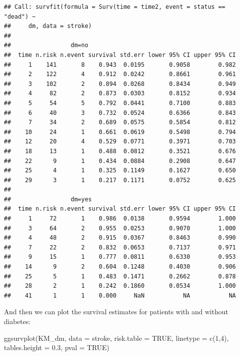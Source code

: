 \documentclass[
  10pt,
]{krantz}
\newenvironment{Shaded}{\begin{snugshade}}{\end{snugshade}}
\newcommand{\AttributeTok}[1]{\textcolor[rgb]{0.77,0.63,0.00}{#1}}
\newcommand{\ConstantTok}[1]{\textcolor[rgb]{0.00,0.00,0.00}{#1}}
\newcommand{\DecValTok}[1]{\textcolor[rgb]{0.00,0.00,0.81}{#1}}
\newcommand{\FloatTok}[1]{\textcolor[rgb]{0.00,0.00,0.81}{#1}}
\newcommand{\FunctionTok}[1]{\textcolor[rgb]{0.00,0.00,0.00}{#1}}
\newcommand{\NormalTok}[1]{#1}
\begin{document}
\begin{verbatim}
## Call: survfit(formula = Surv(time = time2, event = status == "dead") ~ 
##     dm, data = stroke)
## 
##                 dm=no 
##  time n.risk n.event survival std.err lower 95% CI upper 95% CI
##     1    141       8    0.943  0.0195       0.9058        0.982
##     2    122       4    0.912  0.0242       0.8661        0.961
##     3    102       2    0.894  0.0268       0.8434        0.949
##     4     82       2    0.873  0.0303       0.8152        0.934
##     5     54       5    0.792  0.0441       0.7100        0.883
##     6     40       3    0.732  0.0524       0.6366        0.843
##     7     34       2    0.689  0.0575       0.5854        0.812
##    10     24       1    0.661  0.0619       0.5498        0.794
##    12     20       4    0.529  0.0771       0.3971        0.703
##    18     13       1    0.488  0.0812       0.3521        0.676
##    22      9       1    0.434  0.0884       0.2908        0.647
##    25      4       1    0.325  0.1149       0.1627        0.650
##    29      3       1    0.217  0.1171       0.0752        0.625
## 
##                 dm=yes 
##  time n.risk n.event survival std.err lower 95% CI upper 95% CI
##     1     72       1    0.986  0.0138       0.9594        1.000
##     3     64       2    0.955  0.0253       0.9070        1.000
##     4     48       2    0.915  0.0367       0.8463        0.990
##     7     22       2    0.832  0.0653       0.7137        0.971
##     9     15       1    0.777  0.0811       0.6330        0.953
##    14      9       2    0.604  0.1248       0.4030        0.906
##    25      5       1    0.483  0.1471       0.2662        0.878
##    28      2       1    0.242  0.1860       0.0534        1.000
##    41      1       1    0.000     NaN           NA           NA
\end{verbatim}

And then we can plot the survival estimates for patients with and without diabetes:

\begin{Shaded}
\begin{Highlighting}[]
\FunctionTok{ggsurvplot}\NormalTok{(KM\_dm, }
           \AttributeTok{data =}\NormalTok{ stroke, }
           \AttributeTok{risk.table =} \ConstantTok{TRUE}\NormalTok{, }
           \AttributeTok{linetype =} \FunctionTok{c}\NormalTok{(}\DecValTok{1}\NormalTok{,}\DecValTok{4}\NormalTok{), }
           \AttributeTok{tables.height =} \FloatTok{0.3}\NormalTok{,}
           \AttributeTok{pval =} \ConstantTok{TRUE}\NormalTok{)}
\end{Highlighting}
\end{Shaded}
\end{document}
